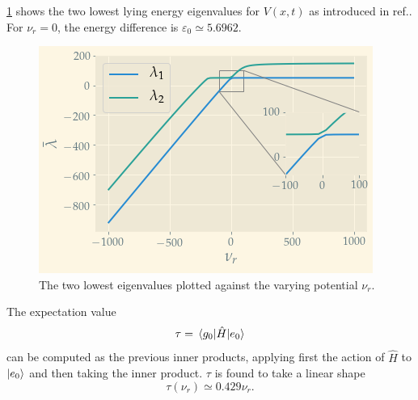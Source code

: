 \cref{fig:e1e2} shows the two lowest lying energy eigenvalues for $V(x, t)$ as introduced in  ref.\cite{assignment}. For $\nu_r = 0$, the energy difference is $\varepsilon_0 \simeq 5.6962$. 
\begin{figure}
	\centering
	\includegraphics[width=\linewidth]{img/e1_e2.png}
	\caption{The two lowest eigenvalues plotted against the varying potential $\nu_r$. }
	\label{fig:e1e2}
\end{figure}

The expectation value 
\begin{equation} 
\tau = \mel{g_0}{\hat H}{e_0}
\end{equation}
can be computed as the previous inner products, applying first the action of $\hat H$ to $\ket{e_0}$ and then taking the inner product. $\tau$ is found to take a linear shape 
\begin{equation}
	\tau(\nu_r) \simeq 0.429\nu_r.
\end{equation}

